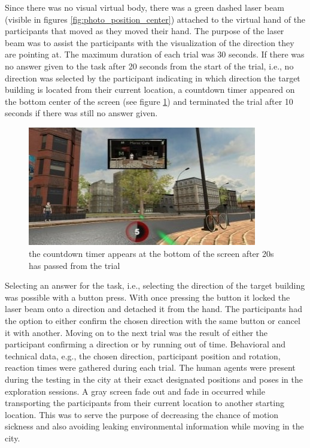 Since there was no visual virtual body, there was a green dashed laser beam (visible in figures \ref{fig:photo_position_center}) attached to the virtual hand of the participants that moved as they moved their hand. The purpose of the laser beam was to assist the participants with the visualization of the direction they are pointing at. The maximum duration of each trial was 30 seconds. If there was no answer given to the task after 20 seconds from the start of the trial, i.e., no direction was selected by the participant indicating in which direction the target building is located from their current location, a countdown timer appeared on the bottom center of the screen (see figure \ref{fig:timer}) and terminated the trial after 10 seconds if there was still no answer given. \\

\begin{figure}[h]
	\centering
	\includegraphics[width=100mm]{figures/timer.jpg}
	\caption[The countdown timer]{the countdown timer appears at the bottom of the screen after 20s has passed from the trial}
	\label{fig:timer}
\end{figure}

Selecting an answer for the task, i.e., selecting the direction of the target building was possible with a button press. With once pressing the button it locked the laser beam onto a direction and detached it from the hand. The participants had the option to either confirm the chosen direction with the same button or cancel it with another. Moving on to the next trial was the result of either the participant confirming a direction or by running out of time. Behavioral and technical data, e.g., the chosen direction, participant position and rotation, reaction times were gathered during each trial. The human agents were present during the testing in the city at their exact designated positions and poses in the exploration sessions. A gray screen fade out and fade in occurred while transporting the participants from their current location to another starting location. This was to serve the purpose of decreasing the chance of motion sickness and also avoiding leaking environmental information while moving in the city.


